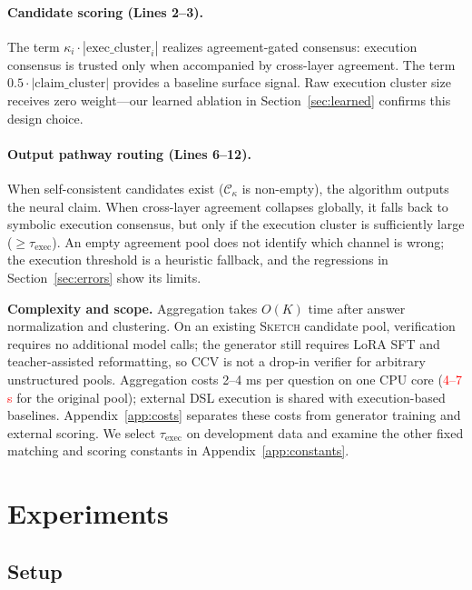 \documentclass{article}
\newcommand{\sketch}{\textsc{Sketch}}
\newcommand{\ccv}{\textsc{CCV}}
\newcommand{\recheck}[1]{\textcolor{red}{#1}}
\begin{document}
\paragraph{Candidate scoring (Lines 2--3).} The term $\kappa_i \cdot |\text{exec\_cluster}_i|$ realizes agreement-gated consensus: execution consensus is trusted only when accompanied by cross-layer agreement. The term $0.5 \cdot |\text{claim\_cluster}|$ provides a baseline surface signal. Raw execution cluster size receives zero weight---our learned ablation in Section~\ref{sec:learned} confirms this design choice.

\paragraph{Output pathway routing (Lines 6--12).} When self-consistent candidates exist ($\mathcal{C}_\kappa$ is non-empty), the algorithm outputs the neural claim. When cross-layer agreement collapses globally, it falls back to symbolic execution consensus, but only if the execution cluster is sufficiently large ($\geq \tau_{\text{exec}}$). An empty agreement pool does not identify which channel is wrong; the execution threshold is a heuristic fallback, and the regressions in Section~\ref{sec:errors} show its limits.

\textbf{Complexity and scope.} Aggregation takes $O(K)$ time after answer normalization and clustering. On an existing \sketch{} candidate pool, verification requires no additional model calls; the generator still requires LoRA SFT and teacher-assisted reformatting, so \ccv{} is not a drop-in verifier for arbitrary unstructured pools. Aggregation costs 2--4 ms per question on one CPU core (\recheck{4--7 s} for the original pool); external DSL execution is shared with execution-based baselines. Appendix~\ref{app:costs} separates these costs from generator training and external scoring. We select $\tau_{\text{exec}}$ on development data and examine the other fixed matching and scoring constants in Appendix~\ref{app:constants}.

\section{Experiments}
\label{sec:experiments}

\subsection{Setup}
\end{document}
